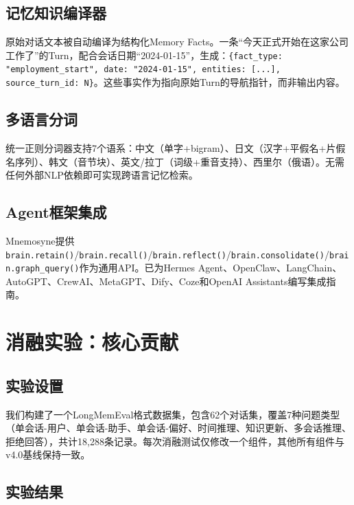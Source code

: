 \documentclass[11pt,a4paper]{ctexart}
\begin{document}
\subsection{记忆知识编译器}

原始对话文本被自动编译为结构化Memory Facts。一条“今天正式开始在这家公司工作了”的Turn，配合会话日期“2024-01-15”，生成：\texttt{\{fact\_type: "employment\_start", date: "2024-01-15", entities: [...], source\_turn\_id: N\}}。这些事实作为指向原始Turn的导航指针，而非输出内容。

\subsection{多语言分词}

统一正则分词器支持7个语系：中文（单字+bigram）、日文（汉字+平假名+片假名序列）、韩文（音节块）、英文/拉丁（词级+重音支持）、西里尔（俄语）。无需任何外部NLP依赖即可实现跨语言记忆检索。

\subsection{Agent框架集成}

Mnemosyne提供\texttt{brain.retain()}/\texttt{brain.recall()}/\texttt{brain.reflect()}/\texttt{brain.consolidate()}/\texttt{brain.graph\_query()}作为通用API。已为Hermes Agent、OpenClaw、LangChain、AutoGPT、CrewAI、MetaGPT、Dify、Coze和OpenAI Assistants编写集成指南。

\section{消融实验：核心贡献}

\subsection{实验设置}

我们构建了一个LongMemEval格式数据集，包含62个对话集，覆盖7种问题类型（单会话-用户、单会话-助手、单会话-偏好、时间推理、知识更新、多会话推理、拒绝回答），共计18,288条记录。每次消融测试仅修改一个组件，其他所有组件与v4.0基线保持一致。

\subsection{实验结果}
\end{document}
